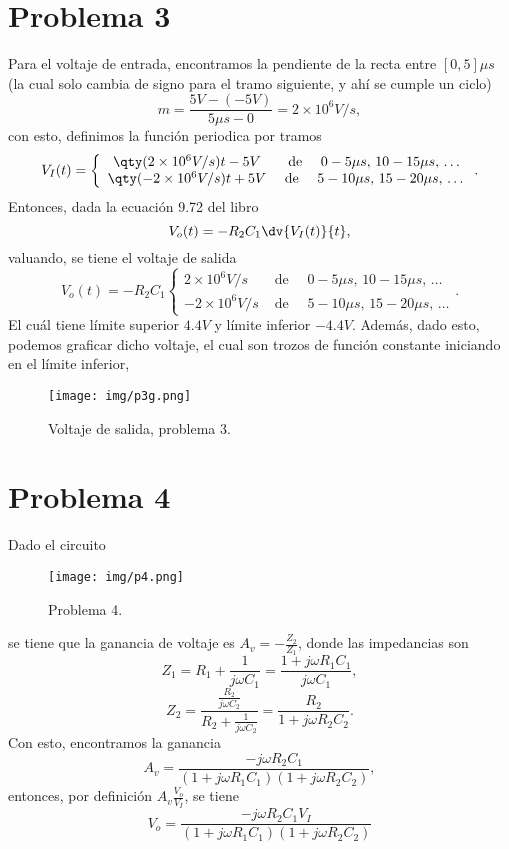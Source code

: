 \documentclass[conference]{IEEEtran}
\begin{document}
\section{Problema 3}
Para el voltaje de entrada, encontramos la pendiente de la recta entre $[0,5] \mu s$ (la cual solo cambia de signo para el tramo siguiente, y ahí se cumple un ciclo)
	$$ m = \frac{5V - (-5V)}{5\mu s - 0} = 2\times 10^6 V/s, $$
con esto, definimos la función periodica por tramos
	$$
		V_I (t) = \left\{\begin{array}{cc}
			\qty(2\times 10^6 V/s)t - 5V & \text{ de } \quad 0-5\mu s, \, 10-15\mu s, \, \ldots \\
			\qty(-2\times 10^6 V/s)t + 5V & \text{ de } \quad 5-10\mu s, \, 15-20\mu s, \, \ldots 
		\end{array}\right. .
	$$
Entonces, dada la ecuación 9.72 del libro \cite{b1}
	$$ V_o (t) = -R_2 C_1 \dv{V_I (t)}{t}, $$
valuando, se tiene el voltaje de salida
	$$ 
		V_o (t) = -R_2 C_1 \left\{\begin{array}{cc}
			2\times 10^6 V/s & \text{ de } \quad 0-5\mu s, \, 10-15\mu s, \, \ldots \\
			-2\times 10^6 V/s & \text{ de } \quad 5-10\mu s, \, 15-20\mu s, \, \ldots
		\end{array}\right. .
	$$
El cuál tiene límite superior $4.4V$ y límite inferior $-4.4V$. Además, dado esto, podemos graficar dicho voltaje, el cual son trozos de función constante iniciando en el límite inferior,
\begin{figure}[H]
	\centering
	\texttt{[image: img/p3g.png]}
	\caption{Voltaje de salida, problema 3.}
	\label{p2e}
\end{figure}

\vspace{0.3cm}

\section{Problema 4}
Dado el circuito
\begin{figure}[H]
	\centering
	\texttt{[image: img/p4.png]}
	\caption{Problema 4.}
	\label{p2e}
\end{figure}

se tiene que la ganancia de voltaje es $A_v = -\frac{Z_2}{Z_1}$, donde las impedancias son
	$$ Z_1 = R_1 + \frac{1}{j\omega C_1} = \frac{1 + j\omega R_1 C_1}{j\omega C_1}, $$
	$$ Z_2 = \frac{\frac{R_2}{j\omega C_2}}{R_2 + \frac{1}{j\omega C_2}} = \frac{R_2}{1 + j\omega R_2 C_2}. $$
Con esto, encontramos la ganancia
	$$ A_v = \frac{-j\omega R_2 C_1}{(1 + j\omega R_1 C_1)(1 + j\omega R_2 C_2)}, $$	
entonces, por definición $A_v \frac{V_o}{V_I}$, se tiene
	$$ \boxed{ V_o = \frac{-j\omega R_2 C_1 V_I}{(1 + j\omega R_1 C_1)(1 + j\omega R_2 C_2)} } $$
\end{document}
